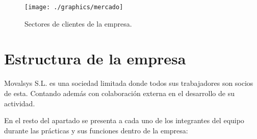 	 \begin{figure}[H]
	 	\centering
	 	\texttt{[image: ./graphics/mercado]}\label{mercado}
	  	\caption{Sectores de clientes de la empresa.} 
	 \label{fig:mercado}
	 	
	 \end{figure}
 
	\section{Estructura de la empresa} \label{empresa}
	

		Movalsys S.L. es una sociedad limitada donde todos sus trabajadores son socios de esta. Contando además con colaboración externa en el desarrollo de su actividad. 
		
		En el resto del apartado se presenta a cada uno de los integrantes del equipo durante las prácticas y sus funciones dentro de la empresa:
		
